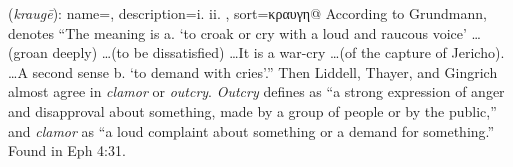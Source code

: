 \item[Clamor,]

(\textit{kraugē}):
{
    name=,
    description={i.  ii. },
    sort=κραυγη@
}
According to Grundmann,  denotes ``The meaning is a. `to croak or cry with a loud and raucous voice' \ldots (groan deeply) \ldots (to be dissatisfied) \ldots It is a war-cry \ldots (of the capture of Jericho). \ldots A second sense b. `to demand with cries'.'' Then Liddell, Thayer, and Gingrich almost agree in \emph{clamor} or \emph{outcry}. \emph{Outcry} defines as ``a strong expression of anger and disapproval about something, made by a group of people or by the public,'' and \emph{clamor} as ``a loud complaint about something or a demand for something.''
Found in Eph 4:31.
